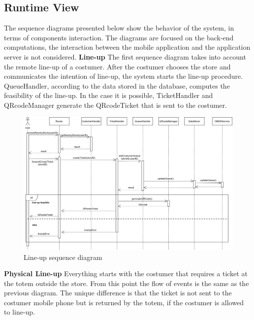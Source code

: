 \documentclass[]{article}
\begin{document}
	\newpage
	
	
	
	
	
	\subsection{Runtime View}
	The sequence diagrams presented below show the behavior of the system, in terms of components interaction. The diagrams are focused on the back-end computations, the interaction between the mobile application and the application server is not considered.
	\newline
	\newline
	\noindent
	\textbf{Line-up}
	\newline \newline
	The first sequence diagram takes into account the remote line-up of a costumer.
	After the costumer chooses the store and communicates the intention of line-up, the system starts the line-up procedure. QueueHandler, according to the data stored in the database, computes the feasibility of the line-up. In the case it is possible, TicketHandler and QRcodeManager generate the QRcodeTicket that is sent to the costumer.
	\bigskip
	\bigskip
	
	\begin{figure}[H]
		\centering
		\includegraphics[scale=0.6]{lineupSequence}
		\caption{Line-up sequence diagram}
	\end{figure}
	
	\newpage
	\noindent
	\textbf{Physical Line-up}
	\newline \newline
	Everything starts with the costumer that requires a ticket at the totem outside the store. From this point the flow of events is the same as the previous diagram. The unique difference is that the ticket is not sent to the costumer mobile phone but is returned by the totem, if the costumer is allowed to line-up.
	\bigskip
	
\end{document}
